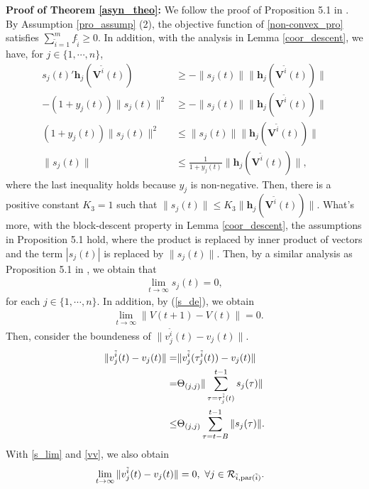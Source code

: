 \documentclass[journal]{IEEEtran}
\begin{document}
\par \textbf{Proof of Theorem \ref{asyn_theo}:} We follow the proof of Proposition 5.1 in  \cite{paral_distri_book}. By Assumption \ref{pro_assump} (2), the objective function of \eqref{non-convex_pro} satisfies $\sum_{\tilde{i}=1}^m f_{\tilde{i}}\geq 0$. In addition, with the analysis in Lemma \ref{coor_descent}, we have, for $j\in \{1,\cdots,n\}$,
\begin{align*}
s_j(t)'\mathbf{h}_j(\mathbf{V}^{\tilde{i}}(t))&\geq -\|s_j(t)\|\|\mathbf{h}_j(\mathbf{V}^{\tilde{i}}(t))\|\\
-(1+y_j(t))\|s_j(t)\|^2 &\geq -\|s_j(t)\|\|\mathbf{h}_j(\mathbf{V}^{\tilde{i}}(t))\|\\
(1+y_j(t))\|s_j(t)\|^2 &\leq \|s_j(t)\|\|\mathbf{h}_j(\mathbf{V}^{\tilde{i}}(t))\|\\
\|s_j(t)\|&\leq \frac{1}{1+y_j(t)}\|\mathbf{h}_j(\mathbf{V}^{\tilde{i}}(t))\|,
\end{align*}
where the last inequality holds because $y_j$ is non-negative. Then, there is a positive constant $K_3=1$ such that $\|s_j(t)\|\leq K_3 \|\mathbf{h}_j(\mathbf{V}^{\tilde{i}}(t))\|$. 
What's more, {with the block-descent property in Lemma \ref{coor_descent},} the assumptions in Proposition 5.1 \cite{paral_distri_book} hold, where the  product is replaced by inner product of vectors and the term $\left|s_j(t)\right|$ is replaced by $\|s_j(t)\|$. Then, by a similar analysis as Proposition 5.1 in \cite{paral_distri_book}, we obtain that 
\begin{align}\label{s_lim}
\lim_{t \to \infty} s_j(t)=0,
\end{align}
for each $j\in\{1,\cdots,n\}$. In addition, by (\ref{s_de}), we obtain
\begin{align}
&\lim_{t\to \infty}\|V(t+1)-V(t)\|=0.\label{Vgap}
\end{align}
Then, consider the boundeness of $\|v_j^{\tilde{i}}(t)-v_j(t)\|$.
\begin{align}\label{vv}
\|v_j^{\tilde{i}}(t)-v_j(t)\|=&\|v_j^{\tilde{i}}(\tau_j^{\tilde{i}}(t))-v_j(t)\|\notag\\
=&\Theta_{(j,j)}\|\sum_{\tau=\tau_{j}^{\tilde{i}}(t)}^{t-1}s_j(\tau)\|\notag\\
\leq &\Theta_{(j,j)}\sum_{\tau=t-B}^{t-1}\|s_j(\tau)\|.
\end{align}
With \eqref{s_lim} and \eqref{vv}, we also obtain
\begin{align}
&\lim_{t\to \infty}\|v_j^{\tilde{i}}(t)-v_j(t)\|=0, \ \forall j\in \mathcal{R}_{\tilde{i},{\rm par}(\tilde{i})}.\label{ViVgap}
\end{align}
\end{document}
